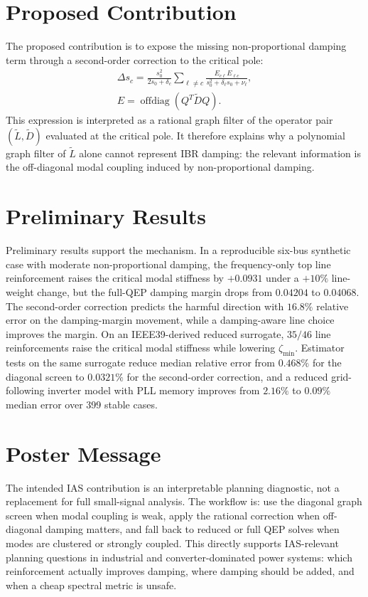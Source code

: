 \documentclass[conference]{IEEEtran}
\newcommand{\Lt}{\widetilde L}
\newcommand{\Dt}{\widetilde D}
\begin{document}
\section*{Proposed Contribution}
The proposed contribution is to expose the missing non-proportional damping term through a second-order correction to the critical pole:
\begin{multline}
\Delta s_c=
\frac{s_0^2}{2s_0+\delta_c}
\sum_{\ell\neq c}
\frac{E_{c\ell}E_{\ell c}}
{s_0^2+\delta_\ell s_0+\nu_\ell},\\
E=\operatorname{offdiag}(Q^T\Dt Q).
\end{multline}
This expression is interpreted as a rational graph filter of the operator pair \((\Lt,\Dt)\) evaluated at the critical pole. It therefore explains why a polynomial graph filter of \(\Lt\) alone cannot represent IBR damping: the relevant information is the off-diagonal modal coupling induced by non-proportional damping.

\section*{Preliminary Results}
Preliminary results support the mechanism. In a reproducible six-bus synthetic case with moderate non-proportional damping, the frequency-only top line reinforcement raises the critical modal stiffness by \(+0.0931\) under a \(+10\%\) line-weight change, but the full-QEP damping margin drops from \(0.04204\) to \(0.04068\). The second-order correction predicts the harmful direction with \(16.8\%\) relative error on the damping-margin movement, while a damping-aware line choice improves the margin. On an IEEE39-derived reduced surrogate, \(35/46\) line reinforcements raise the critical modal stiffness while lowering \(\zeta_{\min}\). Estimator tests on the same surrogate reduce median relative error from \(0.468\%\) for the diagonal screen to \(0.0321\%\) for the second-order correction, and a reduced grid-following inverter model with PLL memory improves from \(2.16\%\) to \(0.09\%\) median error over 399 stable cases.

\section*{Poster Message}
The intended IAS contribution is an interpretable planning diagnostic, not a replacement for full small-signal analysis. The workflow is: use the diagonal graph screen when modal coupling is weak, apply the rational correction when off-diagonal damping matters, and fall back to reduced or full QEP solves when modes are clustered or strongly coupled. This directly supports IAS-relevant planning questions in industrial and converter-dominated power systems: which reinforcement actually improves damping, where damping should be added, and when a cheap spectral metric is unsafe.
\end{document}

